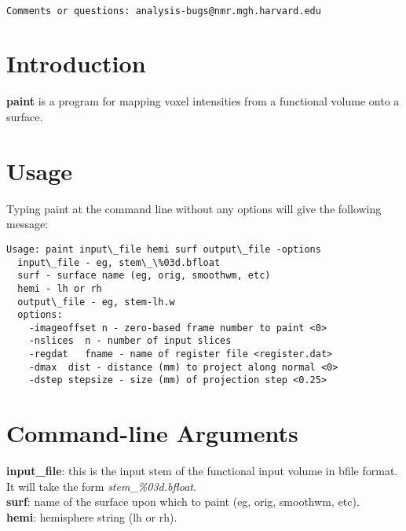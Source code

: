 \documentclass[10pt]{article}
\begin{document}
\begin{Large}
 \\
\end{Large}

\noindent 
\begin{verbatim}
Comments or questions: analysis-bugs@nmr.mgh.harvard.edu
\end{verbatim}

\section{Introduction}
{\bf paint} is a program for mapping voxel intensities from a
functional volume onto a surface.

\section{Usage}
Typing paint at the command line without any options will give the
following message:\\ 

\begin{small}
\begin{verbatim}
Usage: paint input\_file hemi surf output\_file -options
  input\_file - eg, stem\_\%03d.bfloat
  surf - surface name (eg, orig, smoothwm, etc)
  hemi - lh or rh
  output\_file - eg, stem-lh.w 
  options:
    -imageoffset n - zero-based frame number to paint <0>
    -nslices  n - number of input slices
    -regdat   fname - name of register file <register.dat>
    -dmax  dist - distance (mm) to project along normal <0>
    -dstep stepsize - size (mm) of projection step <0.25>
\end{verbatim}
\end{small}

\section{Command-line Arguments}

\noindent
{\bf input\_file}: this is the input stem of the functional input 
volume in bfile format.  It will take the form {\em
stem\_\%03d.bfloat}. \\

\noindent
{\bf surf}: name of the surface upon which to paint (eg, orig,
smoothwm, etc).\\

\noindent
{\bf hemi}: hemisphere string (lh or rh).\\
\end{document}
